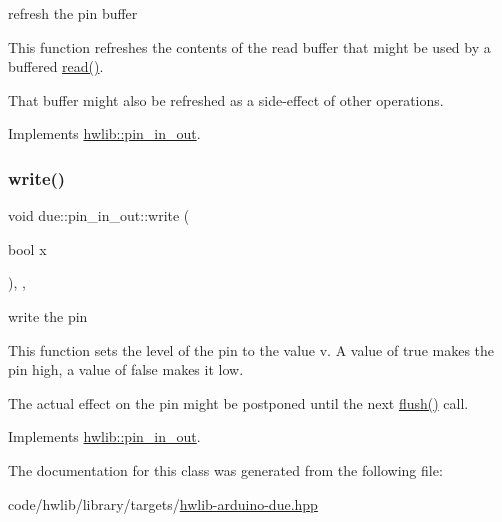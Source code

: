 refresh the pin buffer

This function refreshes the contents of the read buffer that might be used by a buffered \hyperlink{classdue_1_1pin__in__out_a864093a15647637d71ecd8ded27ba4f8}{read()}.

That buffer might also be refreshed as a side-\/effect of other operations. 

Implements \hyperlink{classhwlib_1_1pin__in__out_a8815baac4e5193ec68795956f5e363a6}{hwlib\+::pin\+\_\+in\+\_\+out}.

\mbox{\label{classdue_1_1pin__in__out_aa6782f78c09d67ce8ded0aaf3e4f5c02}} 
\subsubsection{\texorpdfstring{write()}{write()}}
{\footnotesize\ttfamily void due\+::pin\+\_\+in\+\_\+out\+::write (\begin{DoxyParamCaption}\item[{bool}]{x }\end{DoxyParamCaption})\hspace{0.3cm}{\ttfamily [inline]}, {\ttfamily [override]}, {\ttfamily [virtual]}}

write the pin

This function sets the level of the pin to the value v. A value of true makes the pin high, a value of false makes it low.

The actual effect on the pin might be postponed until the next \hyperlink{classdue_1_1pin__in__out_af138c21a34306d3421e0b961bf9406a1}{flush()} call. 

Implements \hyperlink{classhwlib_1_1pin__in__out_aa5e2adcb5707f86c20b6306fc09f1582}{hwlib\+::pin\+\_\+in\+\_\+out}.



The documentation for this class was generated from the following file\+:\begin{DoxyCompactItemize}
\item 
code/hwlib/library/targets/\hyperlink{hwlib-arduino-due_8hpp}{hwlib-\/arduino-\/due.\+hpp}\end{DoxyCompactItemize}
